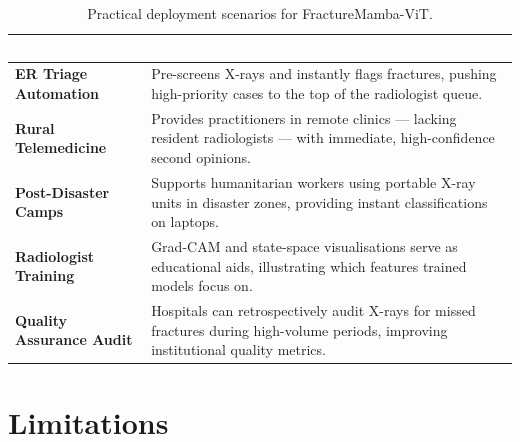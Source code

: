 \documentclass[12pt, a4paper]{article}
\begin{document}
\begin{table}[H]
\centering
\caption{Practical deployment scenarios for FractureMamba-ViT.}
\label{tab:apps}
\begin{tabularx}{\textwidth}{>{\bfseries}lX}
\toprule
\rowcolor{NavyBlue}
\textcolor{white}{Application} & \textcolor{white}{Description} \\
\midrule
ER Triage Automation     & Pre-screens X-rays and instantly flags fractures, pushing
                           high-priority cases to the top of the radiologist queue. \\
Rural Telemedicine       & Provides practitioners in remote clinics — lacking resident
                           radiologists — with immediate, high-confidence second opinions. \\
Post-Disaster Camps      & Supports humanitarian workers using portable X-ray units in
                           disaster zones, providing instant classifications on laptops. \\
Radiologist Training     & Grad-CAM and state-space visualisations serve as educational
                           aids, illustrating which features trained models focus on. \\
Quality Assurance Audit  & Hospitals can retrospectively audit X-rays for missed fractures
                           during high-volume periods, improving institutional quality metrics. \\
\bottomrule
\end{tabularx}
\end{table}

\section{Limitations}
\end{document}
